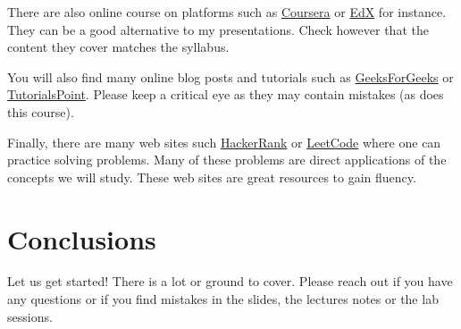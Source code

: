 \documentclass{aldast}
\begin{document}
There are also online course on platforms such as
\href{https://www.coursera.org}{Coursera} or
\href{https://www.edx.org}{EdX} for instance. They can be a good
alternative to my presentations. Check however that the content they
cover matches the syllabus.

You will also find many online blog posts and tutorials such as
\href{www.geeksforgeeks.com}{GeeksForGeeks} or
\href{www.tutorialspoint.com}{TutorialsPoint}. Please keep a critical
eye as they may contain mistakes (as does this course).

Finally, there are many web sites such
\href{http://www.hackerrank.com}{HackerRank} or
\href{https://leetcode.com}{LeetCode} where one can practice solving
problems. Many of these problems are direct applications of the
concepts we will study. These web sites are great resources to gain
fluency.


\section*{Conclusions}
Let us get started! There is a lot or ground to cover. Please reach
out if you have any questions or if you find mistakes in the slides,
the lectures notes or the lab sessions.



\end{document}

